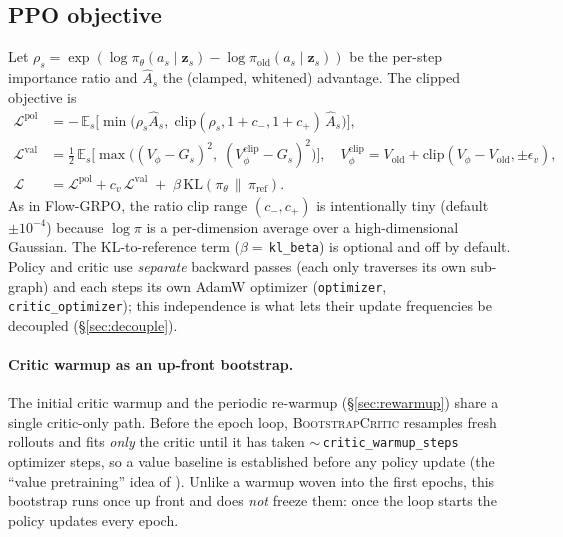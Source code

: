 \documentclass[11pt]{article}
\theoremstyle{plain}
\theoremstyle{remark}
\newcommand{\zt}{\bm{z}}
\newcommand{\E}{\mathbb{E}}
\begin{document}
\subsection{PPO objective}
\label{sec:objective}

Let $\rho_s = \exp(\log\pi_\theta(a_s\mid \zt_s) - \log\pi_{\mathrm{old}}(a_s\mid\zt_s))$
be the per-step importance ratio and $\hat A_s$ the (clamped, whitened) advantage.
The clipped objective is
\begin{align}
\mathcal{L}^{\text{pol}}
  &= -\,\E_s\!\big[\min\big(\rho_s \hat A_s,\;
       \mathrm{clip}(\rho_s, 1{+}c_-, 1{+}c_+)\,\hat A_s\big)\big],
       \label{eq:Lpol}\\
\mathcal{L}^{\text{val}}
  &= \tfrac12\,\E_s\!\big[\max\big((V_\phi - G_s)^2,\;
       (V^{\mathrm{clip}}_\phi - G_s)^2\big)\big],
       \quad V^{\mathrm{clip}}_\phi = V_{\mathrm{old}} + \mathrm{clip}(V_\phi{-}V_{\mathrm{old}}, \pm\epsilon_v),
       \label{eq:Lval}\\
\mathcal{L}
  &= \mathcal{L}^{\text{pol}} + c_v\,\mathcal{L}^{\text{val}}
       \;+\; \beta\,\mathrm{KL}(\pi_\theta \,\|\, \pi_{\mathrm{ref}}). \label{eq:Ltot}
\end{align}
As in Flow-GRPO, the ratio clip range $(c_-,c_+)$ is intentionally tiny (default
$\pm 10^{-4}$) because $\log\pi$ is a per-dimension average over a high-dimensional
Gaussian. The KL-to-reference term ($\beta=\,$\texttt{kl\_beta}) is optional and off
by default. Policy and critic use \emph{separate} backward passes (each only
traverses its own sub-graph) and each steps its own AdamW optimizer
(\texttt{optimizer}, \texttt{critic\_optimizer}); this independence is what lets
their update frequencies be decoupled (\S\ref{sec:decouple}).

\paragraph{Critic warmup as an up-front bootstrap.}
The initial critic warmup and the periodic re-warmup (\S\ref{sec:rewarmup}) share a
single critic-only path. Before the epoch loop, \textsc{BootstrapCritic} resamples
fresh rollouts and fits \emph{only} the critic until it has taken
${\sim}\,$\texttt{critic\_warmup\_steps} optimizer steps, so a value baseline is
established before any policy update (the ``value pretraining'' idea of
\cite{liang2026critic}). Unlike a warmup woven into the first epochs, this bootstrap
runs once up front and does \emph{not} freeze them: once the loop starts the policy
updates every epoch.
\end{document}
